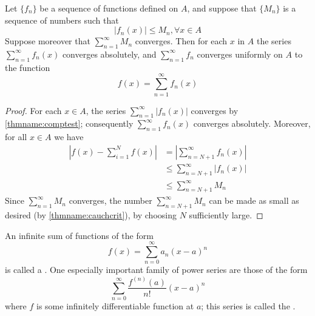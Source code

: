 \begin{namthm}\label{thmname:mtest}
    Let $\{f_n\}$ be a sequence of functions defined on $A$, and suppose that $\{M_n\}$ is a sequence of numbers such that \begin{equation*}
        |f_n(x)|\leq M_n,\forall x \in A
    \end{equation*}
    Suppose moreover that $\sum\limits_{n=1}^{\infty}M_n$ converges. Then for each $x$ in $A$ the series $\sum\limits_{n=1}^{\infty}f_n(x)$ converges absolutely, and $\sum\limits_{n=1}^{\infty}f_n$ converges uniformly on $A$ to the function \begin{equation*}
        f(x) = \sum\limits_{n=1}^{\infty}f_n(x)
    \end{equation*}
\end{namthm}
\begin{proof}
    For each $x \in A$, the series $\sum\limits_{n=1}^{\infty}|f_n(x)|$ converges by \ref{thmname:comptest}; consequently $\sum\limits_{n=1}^{\infty}f_n(x)$ converges absolutely. Moreover, for all $x \in A$ we have \begin{align*}
        \left|f(x) - \sum\limits_{i=1}^{N}f(x)\right| &= \left|\sum\limits_{n=N+1}^{\infty}f_n(x)\right| \\
        &\leq \sum\limits_{n=N+1}^{\infty}|f_n(x)| \\
        &\leq \sum\limits_{n=N+1}^{\infty}M_n
    \end{align*}
    Since $\sum\limits_{n=1}^{\infty}M_n$ converges, the number $\sum\limits_{n=N+1}^{\infty}M_n$ can be made as small as desired (by \ref{thmname:cauchcrit}), by choosing $N$ sufficiently large.
\end{proof}




\begin{defn}
    An infinite sum of functions of the form \begin{equation*}
        f(x) = \sum\limits_{n=0}^{\infty}a_n(x-a)^n
    \end{equation*}
    is called a . One especially important family of power series are those of the form \begin{equation*}
        \sum\limits_{n=0}^{\infty}\frac{f^{(n)}(a)}{n!}(x-a)^n
    \end{equation*}
    where $f$ is some infinitely differentiable function at $a$; this series is called the .
\end{defn}


